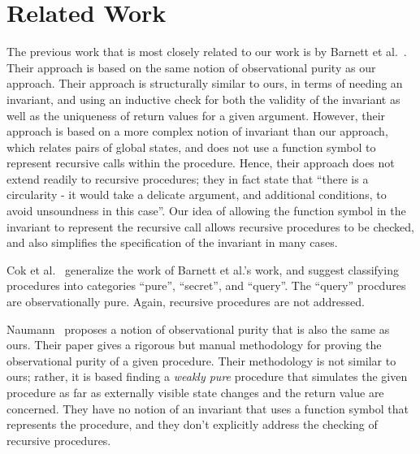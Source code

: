 \section{Related Work}\label{sec:related}

The previous work that is most closely related to our work is by Barnett et
al.~\cite{barnett200499,barnett2006allowing}. Their approach is based on
the same notion of observational purity as our approach. Their approach is
structurally similar to ours, in terms of needing an invariant, and using
an inductive check for both the validity of the invariant as well as the
uniqueness of return values for a given argument.  However, their approach
is based on a more complex notion of invariant than our approach, which
relates pairs of global states, and does not use a function symbol to
represent recursive calls within the procedure. Hence, their approach does
not extend readily to recursive procedures; they in fact state that ``there
is a circularity - it would take a delicate argument, and additional
conditions, to avoid unsoundness in this case''. Our idea of allowing the
function symbol in the invariant to represent the recursive call allows
recursive procedures to be checked, and also simplifies the specification
of the invariant in many cases. 

Cok et al.~\cite{cok2008extensions}  generalize the work of Barnett
et al.'s work, and suggest classifying procedures into categories ``pure'',
``secret'', and ``query''. The ``query'' procdures are observationally
pure. Again, recursive procedures are not addressed.

Naumann~\cite{naumann2007observational} proposes a notion of observational
purity that is also the same as ours. Their paper gives a rigorous but manual
methodology for proving the observational purity of a
given procedure. Their methodology is not similar to ours; rather, it is
based finding a \emph{weakly pure} procedure that simulates the given
procedure as far as externally visible state changes and the return value
are concerned. They have no notion of an invariant that uses a function
symbol that represents the procedure, and they don't explicitly address the
checking of recursive procedures.

